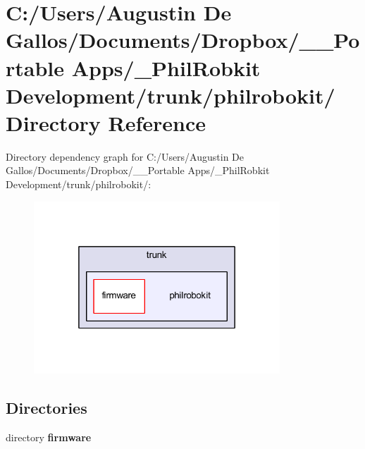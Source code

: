 \section{C\-:/\-Users/\-Augustin De Gallos/\-Documents/\-Dropbox/\-\_\-\-\_\-\-Portable Apps/\-\_\-\-Phil\-Robkit Development/trunk/philrobokit/ Directory Reference}
\label{dir_f3dd6bb354114824ff5394bcc1f7caca}
Directory dependency graph for C\-:/\-Users/\-Augustin De Gallos/\-Documents/\-Dropbox/\-\_\-\-\_\-\-Portable Apps/\-\_\-\-Phil\-Robkit Development/trunk/philrobokit/\-:\nopagebreak
\begin{figure}[H]
\begin{center}
\leavevmode
\includegraphics[width=262pt]{dir_f3dd6bb354114824ff5394bcc1f7caca_dep}
\end{center}
\end{figure}
\subsection*{Directories}
\begin{DoxyCompactItemize}
\item 
directory {\bf firmware}
\end{DoxyCompactItemize}

